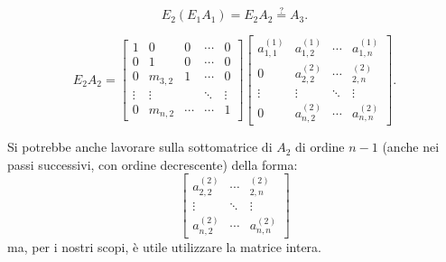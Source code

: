 \begin{equation}E_2(E_1A_1) = E_2A_2 \stackrel{?}{=} A_3.\nonumber
\end{equation}

\[
E_2A_2 =
\left[\begin{array}{ccccc}
1 & 0 & 0  &\cdots & 0 \\
0  & 1 & 0  & \cdots & 0 \\
0 & m_{3,2} & 1  & \cdots & 0 \\
\vdots & \vdots  & &\ddots & \vdots\\
0 & m_{n,2}  & \cdots &\cdots &1
\end{array}\right]
\left[
\begin{array}{cccc}
a_{1,1}^{(1)} & a_{1,2}^{(1)} & \cdots & a_{1,n}^{(1)} \\
0 & a_{2,2}^{(2)} & \cdots & _{2,n}^{(2)} \\
\vdots & \vdots & \ddots & \vdots \\
0 & a_{n,2}^{(2)} & \cdots & a_{n,n}^{(2)}
\end{array} \right].
\]

\begin{osse}
Si potrebbe anche lavorare sulla sottomatrice di $A_2$ di ordine $n-1$
(anche nei passi successivi, con ordine decrescente) della forma:
\[
\left[
\begin{array}{ccc}
a_{2,2}^{(2)} & \cdots & _{2,n}^{(2)} \\
\vdots & \ddots & \vdots \\
a_{n,2}^{(2)} & \cdots & a_{n,n}^{(2)}
\end{array} \right]
\]
ma, per i nostri scopi, è utile utilizzare la matrice intera.
\end{osse}


